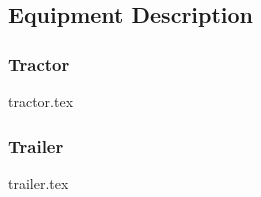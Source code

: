 \subsection{Equipment Description}
\label{subsection:equipment-description}
%
{
    \noindent%
    \begin{minipage}{0.495\linewidth}
        \subsubsection{Tractor}
        \begin{center}
            {tractor.tex}
        \end{center}
    \end{minipage}%
    \hfill%
    \begin{minipage}{0.495\linewidth}
        \subsubsection{Trailer}
        \begin{center}
            {trailer.tex}
        \end{center}
    \end{minipage}
}
\vspace{1em}